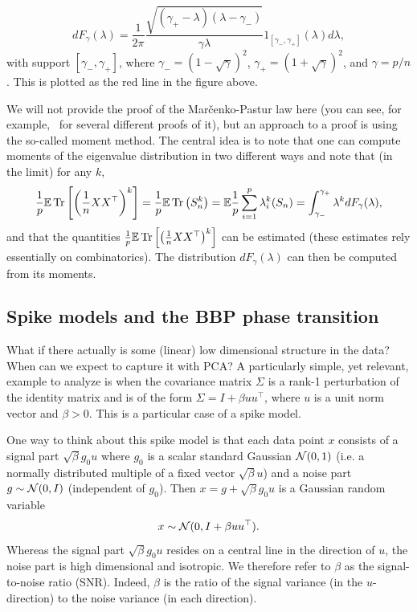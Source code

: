 \begin{equation}\label{eq:MPdist_PCA1}
dF_\gamma(\lambda) = \frac1{2\pi} \frac{\sqrt{\left( \gamma_+ - \lambda \right)\left( \lambda - \gamma_- \right)}}{\gamma \lambda} 1_{\left[ \gamma_-, \gamma_+  \right]}(\lambda) d\lambda,
\end{equation}
with support $\left[ \gamma_-, \gamma_+  \right]$, where $\gamma_- = (1-\sqrt{\gamma})^2$, $\gamma_+= (1+\sqrt{\gamma})^2$, and $\gamma = p/n$. This is plotted as the red line in the figure above.

\begin{remark}
We will not provide the proof of the Mar\v{c}enko-Pastur law here (you can see, for example,~\cite{Bai_MarchenkPastur_manyproofs} for several different proofs of it), but an approach to a proof is using the so-called moment method. The central idea is to note that one can compute moments of the eigenvalue distribution in two different ways and note that (in the limit) for any $k$,
\[
\frac1p \mathbb{E} \operatorname{Tr} \left[ \left( \frac1n XX^\top   \right)^k \right] =  \frac1p \mathbb{E} \operatorname{Tr} \left( S_n^k \right) =\mathbb{E}\frac1p \sum_{i=1}^p \lambda_i^k(S_n) = \int_{\gamma_-}^{\gamma_+} \lambda^k dF_\gamma(\lambda),
\]
and that the quantities $\frac1p \mathbb{E} \operatorname{Tr} \left[ \left( \frac1n XX^\top   \right)^k \right]$ can be estimated (these estimates rely essentially on combinatorics). The distribution $dF_\gamma(\lambda)$ can then be computed from its moments.
\end{remark}





\subsection{Spike models and the BBP phase transition}

What if there actually is some (linear) low dimensional structure in the data? When can we expect to capture it with PCA? A particularly simple, yet relevant, example to analyze is when the covariance matrix $\Sigma$ is a rank-1 perturbation of the identity matrix and is of the form $\Sigma = I + \beta uu^\top  $, where $u$ is a unit norm vector and $\beta > 0$. This is a particular case of a spike model.

One way to think about this spike model is that each data point $x$ consists of a signal part $\sqrt{\beta}g_0 u$ where $g_0$ is a scalar standard Gaussian $\mathcal{N}(0,1)$ (i.e. a normally distributed multiple of a fixed vector $\sqrt{\beta}u$) and a noise part $g\sim\mathcal{N}(0,I)$ (independent of $g_0$). Then $x = g + \sqrt{\beta}g_0 u$ is a Gaussian random variable
\begin{equation}
 \label{eq:spikymodel}  
 x\sim \mathcal{N}(0,I + \beta uu^\top  ).
\end{equation}
Whereas the signal part $\sqrt{\beta}g_0 u$ resides on a central line in the direction of $u$, the noise part is high dimensional and isotropic. We therefore refer to $\beta$ as the signal-to-noise ratio (SNR). Indeed, $\beta$ is the ratio of the signal variance (in the $u$-direction) to the noise variance (in each direction).

